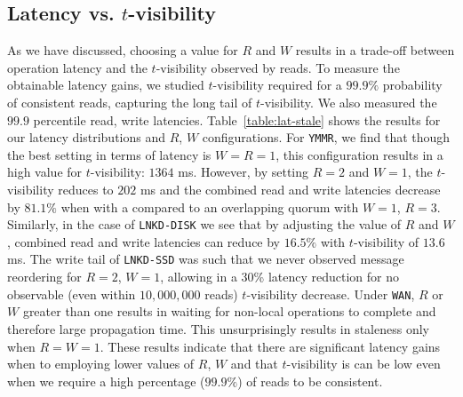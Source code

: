 \documentclass{vldb}
\begin{document}
\subsection{Latency vs. $t$-visibility}

As we have discussed, choosing a value for $R$ and $W$ results in a
trade-off between operation latency and the $t$-visibility observed by
reads. To measure the obtainable latency gains, we studied
$t$-visibility required for a $99.9\%$ probability of consistent
reads, capturing the long tail of $t$-visibility.  We also measured
the $99.9$ percentile read, write latencies.
Table~\ref{table:lat-stale} shows the results for our latency
distributions and $R$, $W$ configurations.  For \texttt{YMMR}, we find
that though the best setting in terms of latency is $W$$=$$R$$=$$1$,
this configuration results in a high value for $t$-visibility: $1364$
ms. However, by setting $R$$=$$2$ and $W$$=$$1$, the $t$-visibility
reduces to $202$ ms and the combined read and write latencies decrease
by $81.1\%$ when with a compared to an overlapping quorum with
$W$$=$$1$, $R$$=$$3$.  Similarly, in the case of \texttt{LNKD-DISK} we
see that by adjusting the value of $R$ and $W$, combined read and
write latencies can reduce by $16.5\%$ with $t$-visibility of $13.6$
ms.  The write tail of \texttt{LNKD-SSD} was such that we never
observed message reordering for $R$$=$$2$, $W$$=$$1$, allowing in a
30\% latency reduction for no observable (even within $10,000,000$
reads) $t$-visibility decrease.  Under \texttt{WAN}, $R$ or $W$
greater than one results in waiting for non-local operations to
complete and therefore large propagation time.  This unsurprisingly
results in staleness only when $R$$=$$W$$=$$1$.  These results
indicate that there are significant latency gains when to employing
lower values of $R$, $W$ and that $t$-visibility is can be low even
when we require a high percentage ($99.9\%$) of reads to be
consistent.
\end{document}
